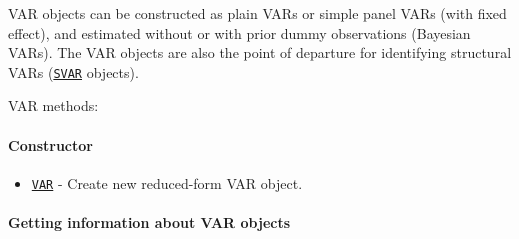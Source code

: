 

	VAR objects can be constructed as plain VARs or simple panel VARs (with
 fixed effect), and estimated without or with prior dummy observations
 (Bayesian VARs). The VAR objects are also the point of departure for
 identifying structural VARs (\href{SVAR/Contents}{\texttt{SVAR}}
 objects).
 
 VAR methods:
 
 \paragraph{Constructor}
 
 \begin{itemize}
 \item
   \href{VAR/VAR}{\texttt{VAR}} - Create new reduced-form VAR object.
 \end{itemize}
 
 \paragraph{Getting information about VAR objects}
 
